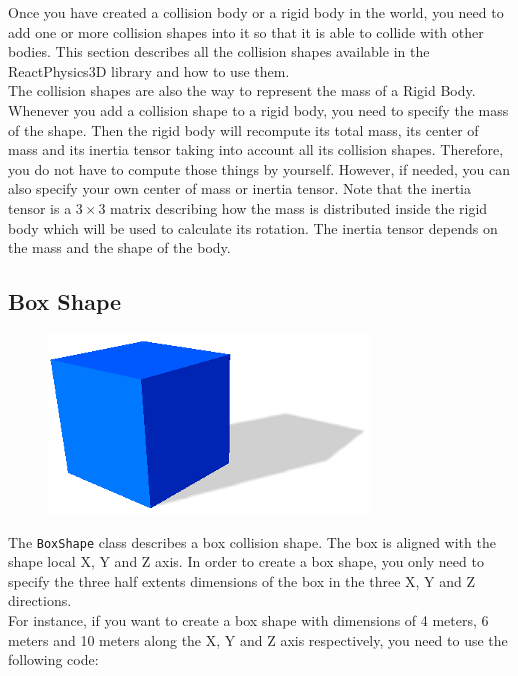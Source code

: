 \documentclass[a4paper,12pt]{article}
\begin{document}
    Once you have created a collision body or a rigid body in the world, you need to add one or more collision shapes into it so that it is able to collide with other bodies.
    This section describes all the collision shapes available in the ReactPhysics3D library and how to use them. \\

    The collision shapes are also the way to represent the mass of a Rigid Body. Whenever you add a collision shape to a rigid body, you need to specify the mass of the shape.
    Then the rigid body will recompute its total mass, its center of mass and its inertia tensor taking into account all its collision shapes. Therefore, you do not have to compute
    those things by yourself. However, if needed, you can also specify your own center of mass or inertia tensor. Note that the inertia tensor is a $3 \times 3$ matrix describing
    how the mass is distributed inside the rigid body which will be used to calculate its rotation. The inertia tensor depends on the mass and the shape of the body. \\

    \subsection{Box Shape}

    \begin{figure}[h]
        \centering
        \includegraphics{boxshape.png}
        \label{fig:boxshape}
    \end{figure}

    The \texttt{BoxShape} class describes a box collision shape. The box is aligned with the shape local X, Y and Z axis.
    In order to create a box shape, you only need to specify the three half extents dimensions of the box in the three X, Y and Z directions. \\

    For instance, if you want to create a box shape with dimensions of 4 meters, 6 meters and 10 meters along the X, Y and Z axis respectively, you need to use the
    following code: \\
\end{document}
